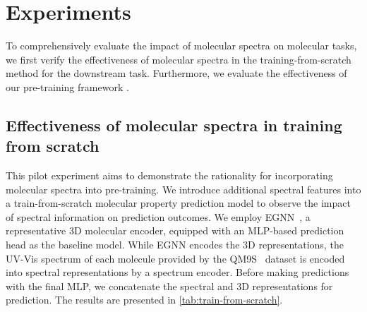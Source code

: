 \section{Experiments}

To comprehensively evaluate the impact of molecular spectra on molecular tasks, we first 
verify the effectiveness of molecular spectra in the training-from-scratch method for the downstream task.
Furthermore, we evaluate the effectiveness of our pre-training framework \themodel.

\subsection{Effectiveness of molecular spectra in training from scratch}\label{sec:exp-train-from-scratch}
This pilot experiment aims to demonstrate the rationality for incorporating molecular spectra into pre-training. We introduce additional spectral features into a train-from-scratch molecular property prediction model to observe the impact of spectral information on prediction outcomes. We employ EGNN~\citep{EGNN}, a representative 3D molecular encoder, equipped with an MLP-based prediction head as the baseline model. While EGNN encodes the 3D representations, {the UV-Vis spectrum of each molecule provided by the QM9S~\citep{DetaNet} dataset} is encoded into spectral representations by a spectrum encoder. Before making predictions with the final MLP, we concatenate the spectral and 3D representations for prediction. The results are presented in \cref{tab:train-from-scratch}.

\begin{table}[th]
  \caption{Performance (MAE $\downarrow$) when training from scratch on QM9 dataset.}
  \label{tab:train-from-scratch}
  \centering
\end{table}

